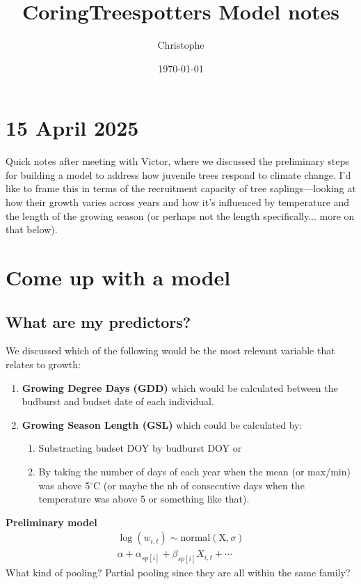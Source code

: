 \documentclass[a4paper,12pt]{article}
\title{CoringTreespotters Model notes}
\author{Christophe}
\date{\today}
\begin{document}
\maketitle

\section*{15 April 2025}
Quick notes after meeting with Victor, where we discussed the preliminary steps for building a model to address how juvenile trees respond to climate change. I’d like to frame this in terms of the recruitment capacity of tree saplings—looking at how their growth varies across years and how it’s influenced by temperature and the length of the growing season (or perhaps not the length specifically... more on that below).

\section{Come up with a model}

\subsection*{What are my predictors?}
We discussed which of the following would be the most relevant variable that relates to growth:
\begin{enumerate}
	\item \textbf{Growing Degree Days (GDD)} which would be calculated between the budburst and budset date of each individual. 
	\item \textbf{Growing Season Length (GSL)} which could be calculated by:
	\begin{enumerate}
		\item Substracting budset DOY by budburst DOY or 
		\item By taking the number of days of each year when the mean (or max/min) was above 5$^{\circ}$C (or maybe the nb of consecutive days when the temperature was above 5 or something like that).
	\end{enumerate}
\end{enumerate}

\par
\textbf{Preliminary model} \\ 
\begin{align}	
	\log (w_{i,t}) \sim \text{normal}(\text{X}, \sigma) \\
	\alpha + \alpha_{sp[i]} + \beta_{sp[i]} X_{i,t} + \cdots
\end{align} 
What kind of pooling? Partial pooling since they are all within the same family?\\
\end{document}
